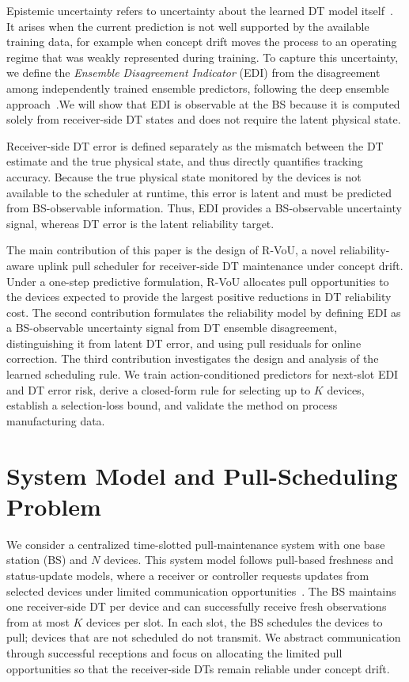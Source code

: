 \documentclass[conference]{IEEEtran}
\begin{document}
Epistemic uncertainty refers
to uncertainty about the learned DT model itself~\cite{waegeman21}. It arises
when the current prediction is not well supported by the available training
data, for example when concept drift moves the process to an operating regime
that was weakly represented during training. To capture this uncertainty, we define the \emph{Ensemble Disagreement Indicator} (EDI) from the disagreement among independently trained ensemble predictors, following the deep ensemble approach~\cite{nips2017}.We will show that EDI is observable at the BS because it is computed solely from receiver-side DT states and does not require the latent physical state.

Receiver-side DT error is defined separately as the mismatch between the DT
estimate and the true physical state, and thus directly quantifies tracking accuracy.
Because the true physical state monitored by the devices is not available to the scheduler at runtime,
this error is latent and must be predicted from BS-observable information.
Thus, EDI provides a BS-observable uncertainty signal, whereas DT error is
the latent reliability target.

The main contribution of this paper is the design of \mbox{R-VoU}, a novel
reliability-aware uplink pull scheduler for receiver-side DT maintenance under
concept drift. Under a one-step predictive formulation, \mbox{R-VoU} allocates pull opportunities to the devices expected to provide the largest positive reductions in DT
reliability cost. The second contribution formulates the
reliability model by defining EDI as a BS-observable uncertainty
signal from DT ensemble disagreement, distinguishing it from latent DT error,
and using pull residuals for online correction. The third contribution investigates the design and analysis of the learned scheduling rule. We train action-conditioned predictors for next-slot EDI and
DT error risk, derive a closed-form rule for selecting up to \(K\) devices,
establish a selection-loss bound, and validate the method on process
manufacturing data.
\vspace{-2.27mm}

\section{System Model and Pull-Scheduling Problem}
\label{sec:maintenance_model}

We consider a centralized time-slotted pull-maintenance system with one
base station (BS) and \(N\) devices. This system model follows pull-based
freshness and status-update models, where a receiver or controller requests
updates from selected devices under limited communication opportunities~\cite{chiariotti2022qaoi,kriole23,agheli2024eff}. The BS maintains one receiver-side DT
per device and can successfully receive fresh observations from at most
\(K\) devices per slot. In each slot, the BS schedules the devices to pull;
devices that are not scheduled do not transmit. We abstract
communication through successful receptions and focus on allocating the
limited pull opportunities so that the receiver-side DTs remain reliable
under concept drift.
\end{document}
